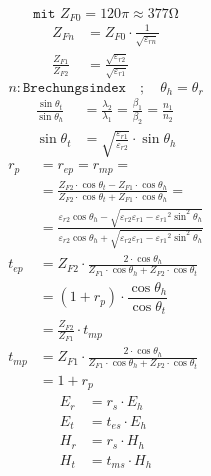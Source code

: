 \[ \boxed{\texttt{mit } Z_{F0} = 120\pi \approx 377\si{\ohm}} \]
\begin{align*}
    Z_{Fn}                & = Z_{F0}\cdot\frac{1}{\sqrt{\varepsilon_{rn}}}            \\
    \frac{Z_{F1}}{Z_{F2}} & = \frac{\sqrt{\varepsilon_{r2}}}{\sqrt{\varepsilon_{r1}}}
\end{align*}
\[ n: \texttt{Brechungsindex} \quad ; \quad \theta_h = \theta_r\]
\begin{align*}
    \frac{\sin\theta_t}{\sin\theta_h} & = \frac{\lambda_2}{\lambda_1}= \frac{\beta_1}{\beta_2}= \frac{n_1}{n_2} \\
    \sin\theta_t                      & = \sqrt{\frac{\varepsilon_{r1}}{\varepsilon_{r2}}}\cdot\sin\theta_h
\end{align*}
\begin{align*}
    r_p     & =  r_{e p} = r_{m p} =                                                                                                                                                                                                      \\
            & = \frac{Z_{F 2} \cdot \cos \theta_t-Z_{F 1} \cdot \cos \theta_h}{Z_{F 2} \cdot \cos \theta_t+Z_{F 1} \cdot \cos \theta_h} =                                                                                                 \\
            & = \frac{\varepsilon_{r2}\cos\theta_h-\sqrt{\varepsilon_{r2}\varepsilon_{r1}-{\varepsilon_{r1}}^2\sin^2\theta_h}}{\varepsilon_{r2}\cos\theta_h+\sqrt{{\varepsilon_{r2}\varepsilon_{r1}-{\varepsilon_{r1}}^2\sin^2\theta_h}}} \\
    t_{e p} & = Z_{F 2} \cdot \frac{2 \cdot \cos \theta_h}{Z_{F 1} \cdot \cos \theta_h+Z_{F 2} \cdot \cos \theta_t}                                                                                                                       \\
            & = (1 + r_{p}) \cdot \dfrac{\cos \theta_h}{\cos \theta_t}                                                                                                                                                                    \\
            & = \frac{Z_{F2}}{Z_{F1}}\cdot t_{mp}                                                                                                                                                                                         \\
    t_{m p} & = Z_{F 1} \cdot \frac{2 \cdot \cos \theta_h}{Z_{F 1} \cdot \cos \theta_h+Z_{F 2} \cdot \cos \theta_t}                                                                                                                       \\
            & = 1+r_{p}
\end{align*}
\begin{align*}
    E_{r} & = r_{s} \cdot E_{h}   \\
    E_{t} & = t_{e s} \cdot E_{h} \\
    H_{r} & = r_{s} \cdot H_{h}   \\
    H_{t} & = t_{m s} \cdot H_{h} \\
\end{align*}
